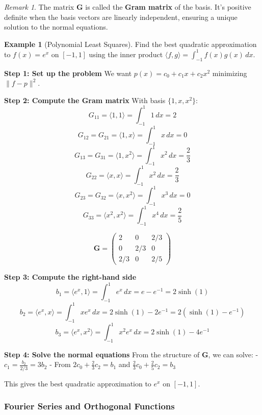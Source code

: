 \documentclass[12pt]{article}
\numberwithin{equation}{section}
\newcommand{\mat}[1]{\mathbf{#1}}        %
\theoremstyle{plain}
\theoremstyle{definition}
\newtheorem{example}[theorem]{Example}
\theoremstyle{remark}
\newtheorem{remark}[theorem]{Remark}
\begin{document}
\begin{remark}
The matrix $\mat{G}$ is called the \textbf{Gram matrix} of the basis. It's positive definite when the basis vectors are linearly independent, ensuring a unique solution to the normal equations.
\end{remark}

\begin{example}[Polynomial Least Squares]
Find the best quadratic approximation to $f(x) = e^x$ on $[-1, 1]$ using the inner product $\langle f, g \rangle = \int_{-1}^1 f(x)g(x) \, dx$.

\textbf{Step 1: Set up the problem}
We want $p(x) = c_0 + c_1 x + c_2 x^2$ minimizing $\|f - p\|^2$.

\textbf{Step 2: Compute the Gram matrix}
With basis $\{1, x, x^2\}$:
$$G_{11} = \langle 1, 1 \rangle = \int_{-1}^1 1 \, dx = 2$$
$$G_{12} = G_{21} = \langle 1, x \rangle = \int_{-1}^1 x \, dx = 0$$
$$G_{13} = G_{31} = \langle 1, x^2 \rangle = \int_{-1}^1 x^2 \, dx = \frac{2}{3}$$
$$G_{22} = \langle x, x \rangle = \int_{-1}^1 x^2 \, dx = \frac{2}{3}$$
$$G_{23} = G_{32} = \langle x, x^2 \rangle = \int_{-1}^1 x^3 \, dx = 0$$
$$G_{33} = \langle x^2, x^2 \rangle = \int_{-1}^1 x^4 \, dx = \frac{2}{5}$$

$$\mat{G} = \begin{pmatrix} 2 & 0 & 2/3 \\ 0 & 2/3 & 0 \\ 2/3 & 0 & 2/5 \end{pmatrix}$$

\textbf{Step 3: Compute the right-hand side}
$$b_1 = \langle e^x, 1 \rangle = \int_{-1}^1 e^x \, dx = e - e^{-1} = 2\sinh(1)$$
$$b_2 = \langle e^x, x \rangle = \int_{-1}^1 xe^x \, dx = 2\sinh(1) - 2e^{-1} = 2(\sinh(1) - e^{-1})$$
$$b_3 = \langle e^x, x^2 \rangle = \int_{-1}^1 x^2e^x \, dx = 2\sinh(1) - 4e^{-1}$$

\textbf{Step 4: Solve the normal equations}
From the structure of $\mat{G}$, we can solve:
- $c_1 = \frac{b_2}{2/3} = 3b_2$
- From $2c_0 + \frac{2}{3}c_2 = b_1$ and $\frac{2}{3}c_0 + \frac{2}{5}c_2 = b_3$

This gives the best quadratic approximation to $e^x$ on $[-1,1]$.
\end{example}

\subsubsection{Fourier Series and Orthogonal Functions}
\end{document}

